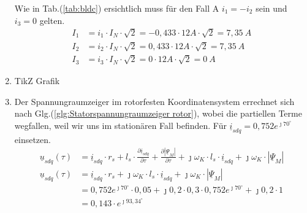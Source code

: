 \begin{solution}
\begin{enumerate}
Wie in Tab.(\ref{tab:bldc}) ersichtlich muss f\"ur den Fall A $i_1= -i_2$ sein und $i_3= 0$ gelten.
\begin{align}
I_1 & = i_1 \cdot I_N \cdot \sqrt{2} = -0,433 \cdot 12 A \cdot \sqrt{2} =7,35~A \\
I_2 & = i_2 \cdot I_N \cdot \sqrt{2} = 0,433 \cdot 12 A \cdot \sqrt{2} =7,35~A \\
I_3 & = i_3 \cdot I_N \cdot \sqrt{2} =0 \cdot 12 A \cdot \sqrt{2} =0~A
\end{align}
\item TikZ Grafik
\item Der Spannungraumzeiger im rotorfesten Koordinatensystem errechnet sich nach Glg.(\ref{glg:Statorspannungraumzeiger rotor}), wobei die partiellen Terme wegfallen, weil wir uns im station\"aren Fall befinden. F\"ur $\underline{i}_{sdq}= 0,752 e^{\jmath 70^\circ}$ einsetzen.
\begin{align}
\underline{u}_{sdq}(\tau) &= \underline{i}_{sdq} \cdot r_s + l_s \cdot \frac{\partial \underline{i}_{sdq}}{\partial \tau} + \frac{\partial |\underline{\Psi}_M|}{\partial \tau} + \jmath \omega_K \cdot l_s \cdot \underline{i}_{sdq} + \jmath \omega_K \cdot |\underline{\Psi}_M|\\
\underline{u}_{sdq}(\tau) &= \underline{i}_{sdq} \cdot r_s + \jmath \omega_K \cdot l_s \cdot \underline{i}_{sdq} + \jmath \omega_K \cdot |\underline{\Psi}_M|\\
&= 0,752 e^{\jmath 70^\circ} \cdot 0,05 + \jmath 0,2 \cdot 0,3 \cdot 0,752 e^{\jmath 70^\circ}+\jmath 0,2 \cdot 1\\
&=0,143 \cdot e^{\jmath 93,34^\circ}
\end{align}
\end{enumerate}
\end{solution}